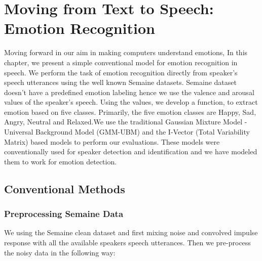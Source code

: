 \chapter{Moving from Text to Speech: Emotion Recognition}\label{chapter:emotionrecognition}
Moving forward in our aim in making computers understand emotions, In this chapter, we present a simple conventional  model for emotion recognition in speech. We perform the task of emotion recognition directly from speaker’s speech utterances using the well known Semaine datasets\footnotemark {}. Semaine dataset doesn’t have a predefined emotion labeling hence we use the valence and arousal values of the speaker’s speech. Using the values, we develop a function, to extract emotion based on five classes. Primarily, the five emotion classes are Happy, Sad, Angry, Neutral and Relaxed.We use the traditional Gaussian Mixture Model - Universal Background Model (GMM-UBM)  and the I-Vector (Total Variability Matrix) based models to perform our evaluations. These models were conventionally used for speaker detection and identification and we have modeled them to work for emotion detection.

\section{Conventional Methods}
	\subsection{Preprocessing Semaine Data}
We using the Semaine clean dataset and first mixing noise and convolved impulse response with all the available speakers speech utterances. Then we pre-process the noisy data in the following way:

